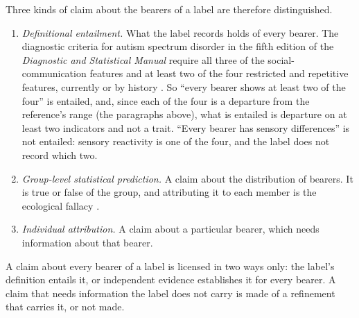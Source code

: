 Three kinds of claim about the bearers of a label are therefore distinguished.
\begin{enumerate}[label=(\roman*), leftmargin=*]
\item \emph{Definitional entailment.} What the label records holds of every bearer. The diagnostic criteria for autism spectrum disorder in the fifth edition of the \emph{Diagnostic and Statistical Manual} require all three of the social-communication features and at least two of the four restricted and repetitive features, currently or by history \cite{APA2013}. So ``every bearer shows at least two of the four'' is entailed, and, since each of the four is a departure from the reference's range (the paragraphs above), what is entailed is departure on at least two indicators and not a trait. ``Every bearer has sensory differences'' is not entailed: sensory reactivity is one of the four, and the label does not record which two.
\item \emph{Group-level statistical prediction.} A claim about the distribution of bearers. It is true or false of the group, and attributing it to each member is the ecological fallacy \cite{Robinson1950}.
\item \emph{Individual attribution.} A claim about a particular bearer, which needs information about that bearer.
\end{enumerate}

\begin{definition}
\label{def:scope}
A claim about every bearer of a label is licensed in two ways only: the label's definition entails it, or independent evidence establishes it for every bearer. A claim that needs information the label does not carry is made of a refinement that carries it, or not made.
\end{definition}


